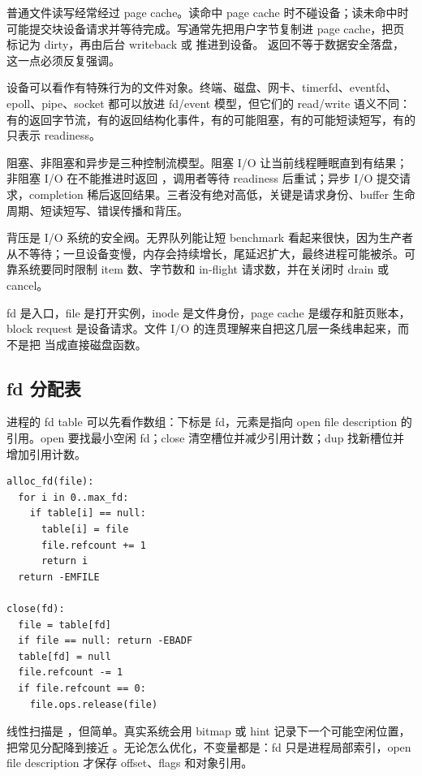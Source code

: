 普通文件读写经常经过 page cache。读命中 page cache 时不碰设备；读未命中时可能提交块设备请求并等待完成。写通常先把用户字节复制进 page cache，把页标记为 dirty，再由后台 writeback 或  推进到设备。 返回不等于数据安全落盘，这一点必须反复强调。

设备可以看作有特殊行为的文件对象。终端、磁盘、网卡、timerfd、eventfd、epoll、pipe、socket 都可以放进 fd/event 模型，但它们的 read/write 语义不同：有的返回字节流，有的返回结构化事件，有的可能阻塞，有的可能短读短写，有的只表示 readiness。

阻塞、非阻塞和异步是三种控制流模型。阻塞 I/O 让当前线程睡眠直到有结果；非阻塞 I/O 在不能推进时返回 ，调用者等待 readiness 后重试；异步 I/O 提交请求，completion 稀后返回结果。三者没有绝对高低，关键是请求身份、buffer 生命周期、短读短写、错误传播和背压。

背压是 I/O 系统的安全阀。无界队列能让短 benchmark 看起来很快，因为生产者从不等待；一旦设备变慢，内存会持续增长，尾延迟扩大，最终进程可能被杀。可靠系统要同时限制 item 数、字节数和 in-flight 请求数，并在关闭时 drain 或 cancel。

\begin{keyidea}
fd 是入口，file 是打开实例，inode 是文件身份，page cache 是缓存和脏页账本，block request 是设备请求。文件 I/O 的连贯理解来自把这几层一条线串起来，而不是把  当成直接磁盘函数。
\end{keyidea}

\subsection{fd 分配表}

进程的 fd table 可以先看作数组：下标是 fd，元素是指向 open file description 的引用。open 要找最小空闲 fd；close 清空槽位并减少引用计数；dup 找新槽位并增加引用计数。

\begin{lstlisting}
alloc_fd(file):
  for i in 0..max_fd:
    if table[i] == null:
      table[i] = file
      file.refcount += 1
      return i
  return -EMFILE

close(fd):
  file = table[fd]
  if file == null: return -EBADF
  table[fd] = null
  file.refcount -= 1
  if file.refcount == 0:
    file.ops.release(file)
\end{lstlisting}

线性扫描是 ，但简单。真实系统会用 bitmap 或 hint 记录下一个可能空闲位置，把常见分配降到接近 。无论怎么优化，不变量都是：fd 只是进程局部索引，open file description 才保存 offset、flags 和对象引用。

